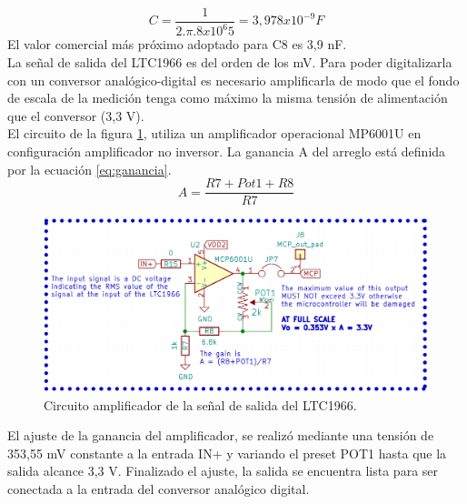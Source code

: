 \begin{equation}
	\label{eq_capacitor_hpf}
	C=\frac{1}{2.\pi.{8x10^6}5}=3,978x10^{-9} F
\end{equation}
El valor comercial más próximo adoptado para C8 es 3,9 nF.\\
La señal de salida del LTC1966 es del orden de los mV. Para poder digitalizarla con un conversor analógico-digital es necesario amplificarla de modo que el fondo de escala de la medición tenga como máximo la misma tensión de alimentación que el conversor (3,3 V).\\
El circuito de la figura \ref{fig:ctoopamp}, utiliza un amplificador operacional MP6001U \citep{mcp6001} en configuración amplificador no inversor. La ganancia A del arreglo est\'{a} definida por la ecuación \ref{eq:ganancia}.
\begin{equation}
\label{eq:ganancia}
	A=\frac{R7+Pot1+R8}{R7}
\end{equation}

\begin{figure}[h!]
	\centering
	\includegraphics[width=1.0\linewidth]{Figures/cto_op_amp}
	\caption{Circuito amplificador de la señal de salida del LTC1966.}
	\label{fig:ctoopamp}
\end{figure}
El ajuste de la ganancia del amplificador, se realiz\'{o} mediante una tensión de 353,55 mV constante a la entrada IN+ y variando el preset POT1 hasta que la salida alcance 3,3 V. Finalizado el ajuste, la salida se encuentra lista para ser conectada a la entrada del conversor analógico digital.\\

